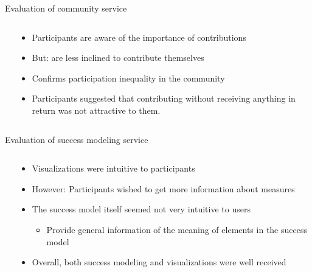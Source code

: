 \begin{frame}{Evaluation of community service}
  \begin{columns}
    \begin{column}[t]{0.5\textwidth}
      
    \end{column}
    \begin{column}[t]{0.5\textwidth}
      \begin{itemize}
        \item Participants are aware of the importance of contributions
        \item But: are less inclined to contribute themselves
        \item Confirms participation inequality in the community  \cite{Niel06}
       \item Participants suggested that contributing without receiving anything in return was not attractive to them.
      \end{itemize}
    \end{column}
  \end{columns}
\end{frame}

\begin{frame}{Evaluation of success modeling service}
  \begin{columns}
    \begin{column}[t]{0.5\textwidth}
      
    \end{column}
    \begin{column}[t]{0.5\textwidth}
      \begin{itemize}
        \item Visualizations were intuitive to participants
        \item However: Participants wished to get more information about measures
        \item The success model itself seemed not very intuitive to users
        \begin{itemize}
          \item Provide general information of the meaning of elements in the success model
        \end{itemize}
        \item Overall, both success modeling and visualizations were well received
      \end{itemize}
    \end{column}
  \end{columns}
\end{frame}


